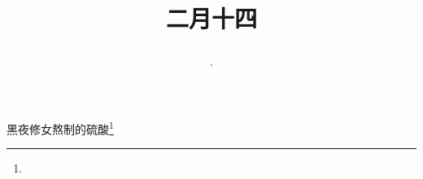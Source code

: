 \title{\date[d=23,m=3,y=2024][year:cn-y,年,month:cn,day:cn,日,·,weekday]·二月十四 }
黑夜修女熬制的硫酸\footnote{ }

